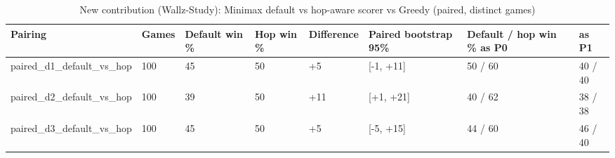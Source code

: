 \begin{table}[htbp]
\centering
\caption{New contribution (Wallz-Study): Minimax default vs hop-aware scorer vs Greedy (paired, distinct games)}
\label{tab:minimax_default_vs_hop}
\begin{tabular}{llllllll}
\toprule
Pairing & Games & Default win \% & Hop win \% & Difference & Paired bootstrap 95\% & Default / hop win \% as P0 & as P1 \\
\midrule
paired\_d1\_default\_vs\_hop & 100 & 45 & 50 & +5 & [-1, +11] & 50 / 60 & 40 / 40 \\
paired\_d2\_default\_vs\_hop & 100 & 39 & 50 & +11 & [+1, +21] & 40 / 62 & 38 / 38 \\
paired\_d3\_default\_vs\_hop & 100 & 45 & 50 & +5 & [-5, +15] & 44 / 60 & 46 / 40 \\
\bottomrule
\end{tabular}
\end{table}
